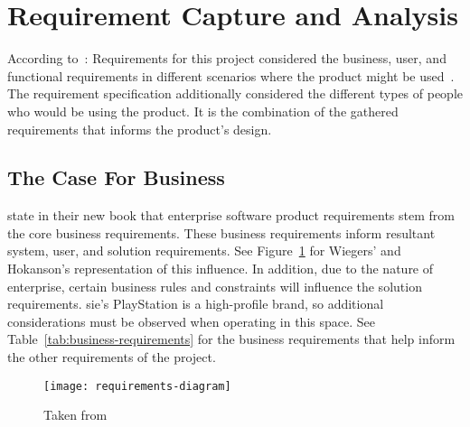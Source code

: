 \thispagestyle{plain}
\newpage
\section{Requirement Capture and Analysis}\label{sec:requirement-capture}

\normalsize

According to~\citet{anton2003successful}: 
Requirements for this project considered the business, user, and functional requirements in different scenarios where the product might be used~\citep{wiegers2000karl, potts1994inquiry}.
The requirement specification additionally considered the different types of people who would be using the product.
It is the combination of the gathered requirements that informs the product's design.

\subsection{The Case For Business}\label{subsec:the-business-case}

\citet{wiegers_hokanson_2023} state in their new book that enterprise software product requirements stem from the core business requirements.
These business requirements inform resultant system, user, and solution requirements.
See Figure~\ref{fig:requirements-diagram} for Wiegers' and Hokanson's representation of this influence.
In addition, due to the nature of enterprise, certain business rules and constraints will influence the solution requirements.
\gls{sie}'s PlayStation is a high-profile brand, so additional considerations must be observed when operating in this space.
See Table~\ref{tab:business-requirements} for the business requirements that help inform the other requirements of the project.

\begin{figure}[!htb]
    \minipage{\textwidth}
    \texttt{[image: requirements-diagram]}
    \caption{Taken from~\citep{wiegers_hokanson_2023}}\label{fig:requirements-diagram}
    \endminipage\hfill
\end{figure}

